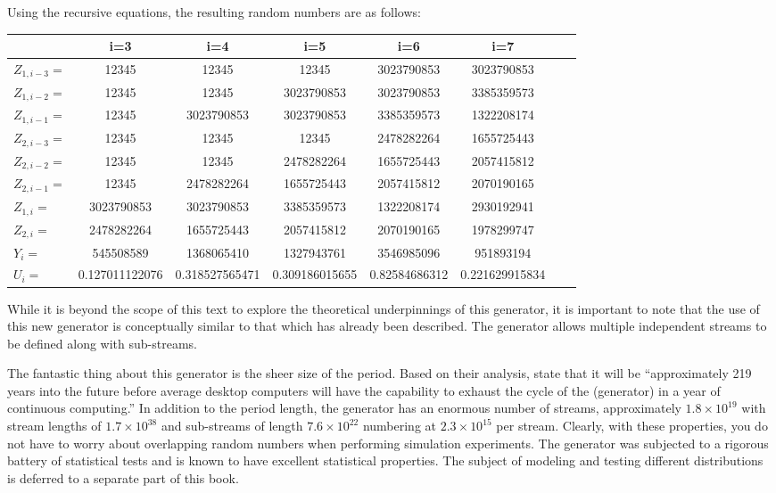 \documentclass[
]{book}
\theoremstyle{definition}
\theoremstyle{definition}
\theoremstyle{definition}
\theoremstyle{definition}
\theoremstyle{remark}
\begin{document}
Using the recursive equations, the resulting random numbers are as follows:

\begin{longtable}[]{@{}lcccccll@{}}
\toprule
& i=3 & i=4 & i=5 & i=6 & i=7 & & \\
\midrule
\endhead
\(Z_{1,i-3}=\) & 12345 & 12345 & 12345 & 3023790853 & 3023790853 & & \\
\(Z_{1,i-2}=\) & 12345 & 12345 & 3023790853 & 3023790853 & 3385359573 & & \\
\(Z_{1,i-1}=\) & 12345 & 3023790853 & 3023790853 & 3385359573 & 1322208174 & & \\
\(Z_{2,i-3}=\) & 12345 & 12345 & 12345 & 2478282264 & 1655725443 & & \\
\(Z_{2,i-2}=\) & 12345 & 12345 & 2478282264 & 1655725443 & 2057415812 & & \\
\(Z_{2,i-1}=\) & 12345 & 2478282264 & 1655725443 & 2057415812 & 2070190165 & & \\
\(Z_{1,i}=\) & 3023790853 & 3023790853 & 3385359573 & 1322208174 & 2930192941 & & \\
\(Z_{2,i}=\) & 2478282264 & 1655725443 & 2057415812 & 2070190165 & 1978299747 & & \\
\(Y_i=\) & 545508589 & 1368065410 & 1327943761 & 3546985096 & 951893194 & & \\
\(U_i=\) & 0.127011122076 & 0.318527565471 & 0.309186015655 & 0.82584686312 & 0.221629915834 & & \\
\bottomrule
\end{longtable}

While it is beyond the scope of this text to explore the theoretical
underpinnings of this generator, it is important to note that the use of
this new generator is conceptually similar to that which has already
been described. The generator allows multiple independent streams to be
defined along with sub-streams.

The fantastic thing about this generator is the sheer size of the
period. Based on their analysis, \citet{ecuyer2002an} state that it will be
``approximately 219 years into the future before average desktop
computers will have the capability to exhaust the cycle of the
(generator) in a year of continuous computing.'' In addition to the
period length, the generator has an enormous number of streams,
approximately \(1.8 \times 10^{19}\) with stream lengths of
\(1.7 \times 10^{38}\) and sub-streams of length \(7.6 \times 10^{22}\)
numbering at \(2.3 \times 10^{15}\) per stream. Clearly, with these
properties, you do not have to worry about overlapping random numbers
when performing simulation experiments. The generator was subjected to a
rigorous battery of statistical tests and is known to have excellent
statistical properties. The subject of modeling and testing different distributions is deferred to a separate part of this book.
\end{document}
